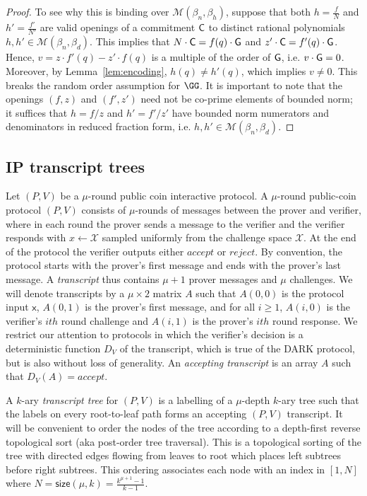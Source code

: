 \begin{proof}
To see why this is binding over $\mathcal{M}(\beta_n, \beta_h)$, suppose that both $h=\frac{f}{N}$ and $h'=\frac{f'}{N'}$ are valid openings of a commitment $\gr{C}$ to distinct rational polynomials $h, h' \in \mathcal{M}(\beta_n, \beta_d)$. This implies that $N\cdot \gr{C} = f(q) \cdot \gr{G}$ and $z' \cdot \gr{C} = f'(q) \cdot \gr{G}$. Hence, $v =  z \cdot f'(q) - z' \cdot f(q)$ is a multiple of the order of $\gr{G}$, i.e. $v \cdot \gr{G} = 0$. Moreover, by Lemma~\ref{lem:encoding}, $h(q) \neq h'(q)$, which implies $v \neq 0$. This breaks the random order assumption for $\GG$. It is important to note that the openings $(f, z)$ and $(f', z')$ need not be co-prime elements of bounded norm; it suffices that $h = f/z$ and $h' = f'/z'$ have bounded norm numerators and denominators in reduced fraction form, i.e. $h, h' \in \mathcal{M}(\beta_n, \beta_d)$. 
\end{proof}



\subsection{IP transcript trees}\label{sec:IPtrees}

Let $(P,V)$ be a $\mu$-round public coin interactive protocol. A $\mu$-round public-coin protocol $(P,V)$ consists of $\mu$-rounds of messages between the prover and verifier, where in each round the prover sends a message to the verifier and the verifier responds with $x \leftarrow \mathcal{X}$ sampled uniformly from the challenge space $\mathcal{X}$. At the end of the protocol the verifier outputs either $accept$ or $reject$. By convention, the protocol starts with the prover's first message and ends with the prover's last message. A \emph{transcript} thus contains $\mu+1$ prover messages and $\mu$ challenges. We will denote transcripts by a $\mu \times 2$ matrix $A$ such that $A(0,0)$ is the protocol input $\mathsf{x}$, $A(0, 1)$ is the prover's first message, and for all $i ≥ 1$, $A(i, 0)$ is the verifier's $ith$ round challenge and $A(i,1)$ is the prover's $ith$ round response.  We restrict our attention to protocols in which the verifier's decision is a deterministic function $D_V$ of the transcript, which is true of the DARK protocol, but is also without loss of generality. An \emph{accepting transcript} is an array $A$ such that $D_V(A) = accept$. 

A $k$-ary \emph{transcript tree} for $(P,V)$ is a labelling of a $\mu$-depth $k$-ary tree such that the labels on every root-to-leaf path forms an accepting $(P,V)$ transcript.  It will be convenient to order the nodes of the tree according to a depth-first reverse topological sort (aka post-order tree traversal). This is a topological sorting of the tree with directed edges flowing from leaves to root which places left subtrees before right subtrees. This ordering associates each node with an index in $[1,N]$ where $N = \textsf{size}(\mu, k) = \frac{k^{\mu+1} - 1}{k-1}$. 

